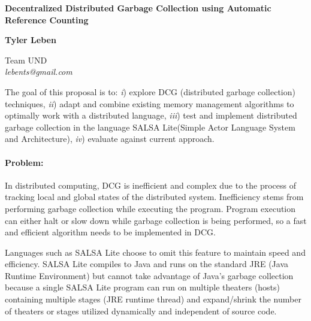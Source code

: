 \documentclass[12pt]{article}
\begin{document}
\pagestyle{empty}
\renewcommand{\thesection}{\Alph{section}}

\setlength{\parsep}{5pt}
\setlength{\parskip}{5pt plus 2pt minus 1pt}

\noindent
{\large\bf Decentralized Distributed Garbage Collection using Automatic Reference Counting}

\begin{center}
		
\begin{minipage}{0.53\linewidth}
	\begin{center}
		{\bf Tyler Leben}\\
			\begin{small}
				Team UND\\
				{\it lebents@gmail.com}
			\end{small}
	\end{center}
\end{minipage}
\end{center}

\noindent
The goal of this proposal is to: {\it i}) explore DCG (distributed garbage collection) techniques, {\it ii}) adapt and combine existing memory management algorithms to optimally work with a distributed language, {\it iii}) test and implement distributed garbage collection in the language SALSA Lite(Simple Actor Language System and Architecture), {\it iv}) evaluate against current approach.

\paragraph{Problem:} \hspace{-5mm} In distributed computing, DCG is inefficient and complex due to the process of tracking local and global states of the distributed system. Inefficiency stems from performing garbage collection while executing the program. Program execution can either halt or slow down while garbage collection is being performed, so a fast and efficient algorithm needs to be implemented in DCG.

\noindent
Languages such as SALSA Lite choose to omit this feature to maintain speed and efficiency. SALSA Lite compiles to Java and runs on the standard JRE (Java Runtime Environment) but cannot take advantage of Java's garbage collection because a single SALSA Lite program can run on multiple theaters (hosts) containing multiple stages (JRE runtime thread) and expand/shrink the number of theaters or stages utilized dynamically and independent of source code. 
\end{document}
